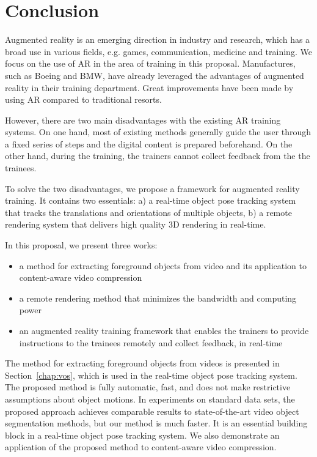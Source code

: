 \chapter{Conclusion}
\label{chap:c}

Augmented reality is an emerging direction in industry and research, which has a broad use in various fields, e.g. games, communication, medicine and training. We focus on the use of AR in the area of training in this proposal. Manufactures, such as Boeing and BMW, have already leveraged the advantages of augmented reality in their training department. Great improvements have been made by using AR compared to traditional resorts.

However, there are two main disadvantages with the existing AR training systems. On one hand, most of existing methods generally guide the user through a fixed series of steps and the digital content is prepared beforehand. On the other hand, during the training, the trainers cannot collect feedback from the the trainees. 

To solve the two disadvantages, we propose a framework for augmented reality training. It contains two essentials: a) a real-time object pose tracking system that tracks the translations and orientations of multiple objects, b) a remote rendering system that delivers high quality 3D rendering in real-time.

In this proposal, we present three works:

\begin{itemize}
  \item
  a method for extracting foreground objects from video and its application to content-aware video compression
  \item
  a remote rendering method that minimizes the bandwidth and computing power
  \item
  an augmented reality training framework that enables the trainers to provide instructions to the trainees remotely and collect feedback, in real-time
\end{itemize}

The method for extracting foreground objects from videos is presented in Section~\ref{chap:vos}, which is used in the real-time object pose tracking system.
The proposed method is fully automatic, fast, and does not make restrictive assumptions about object motions.
In experiments on standard data sets, the proposed approach achieves comparable results to state-of-the-art video object segmentation methods, but our method is much faster.
It is an essential building block in a real-time object pose tracking system.
We also demonstrate an application of the proposed method to content-aware video compression.

